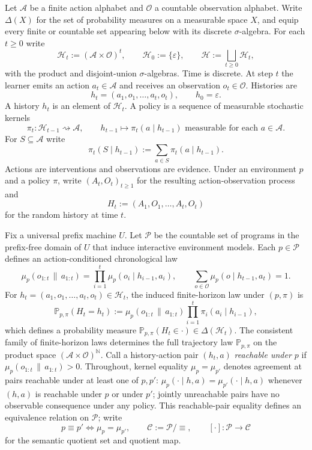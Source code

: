 \documentclass[11pt]{article}
\theoremstyle{definition}
\theoremstyle{remark}
\theoremstyle{plain}
\theoremstyle{definition}
\newcommand{\Acal}{\mathcal{A}}
\newcommand{\Ccal}{\mathcal{C}}
\newcommand{\Ocal}{\mathcal{O}}
\newcommand{\Pcal}{\mathcal{P}}
\newcommand{\Hcal}{\mathcal{H}}
\newcommand{\Prob}{\mathbb{P}}
\newcommand{\givena}{\,\|\,}
\begin{document}
Let $\Acal$ be a finite action alphabet and $\Ocal$ a countable observation alphabet. Write $\Delta(X)$ for the set of probability measures on a measurable space $X$, and equip every finite or countable set appearing below with its discrete $\sigma$-algebra. For each $t\ge 0$ write
\[
\Hcal_t:=(\Acal\times\Ocal)^t,
\qquad
\Hcal_0:=\{\varepsilon\},
\qquad
\Hcal:=\bigsqcup_{t\ge 0}\Hcal_t,
\]
with the product and disjoint-union $\sigma$-algebras. Time is discrete. At step $t$ the learner emits an action $a_t\in\Acal$ and receives an observation $o_t\in\Ocal$. Histories are
\[
h_t=(a_1,o_1,\dots,a_t,o_t),
\qquad
h_0=\varepsilon.
\]
A history $h_t$ is an element of $\Hcal_t$. A policy is a sequence of measurable stochastic kernels
\[
\pi_t:\Hcal_{t-1}\rightsquigarrow \Acal,
\qquad
h_{t-1}\longmapsto \pi_t(a\mid h_{t-1})\text{ measurable for each }a\in\Acal.
\]
For $S\subseteq\Acal$ write
\[
\pi_t(S\mid h_{t-1}):=\sum_{a\in S}\pi_t(a\mid h_{t-1}).
\]
Actions are interventions and observations are evidence. Under an environment $p$ and a policy $\pi$, write $(A_t,O_t)_{t\ge 1}$ for the resulting action-observation process and
\[
H_t:=(A_1,O_1,\dots,A_t,O_t)
\]
for the random history at time $t$.

Fix a universal prefix machine $U$. Let $\Pcal$ be the countable set of programs in the prefix-free domain of $U$ that induce interactive environment models. Each $p\in\Pcal$ defines an action-conditioned chronological law
\[
\mu_p(o_{1:t}\givena a_{1:t})
=
\prod_{i=1}^{t}\mu_p(o_i\mid h_{i-1},a_i),
\qquad
\sum_{o\in\Ocal}\mu_p(o\mid h_{t-1},a_t)=1.
\]
For $h_t=(a_1,o_1,\dots,a_t,o_t)\in\Hcal_t$, the induced finite-horizon law under $(p,\pi)$ is
\[
\Prob_{p,\pi}(H_t=h_t)
:=
\mu_p(o_{1:t}\givena a_{1:t})\prod_{i=1}^t \pi_i(a_i\mid h_{i-1}),
\]
which defines a probability measure $\Prob_{p,\pi}(H_t\in\cdot)\in\Delta(\Hcal_t)$. The consistent family of finite-horizon laws determines the full trajectory law $\Prob_{p,\pi}$ on the product space $(\Acal\times\Ocal)^{\mathbb N}$. Call a history-action pair $(h_t,a)$ \emph{reachable under $p$} if $\mu_p(o_{1:t}\givena a_{1:t})>0$. Throughout, kernel equality $\mu_p=\mu_{p'}$ denotes agreement at pairs reachable under at least one of $p,p'$: $\mu_p(\cdot\mid h,a)=\mu_{p'}(\cdot\mid h,a)$ whenever $(h,a)$ is reachable under $p$ or under $p'$; jointly unreachable pairs have no observable consequence under any policy. This reachable-pair equality defines an equivalence relation on $\Pcal$; write
\[
p\equiv p'
\iff
\mu_p=\mu_{p'},
\qquad
\Ccal:=\Pcal/\!\equiv,
\qquad
[\cdot]:\Pcal\to\Ccal
\]
for the semantic quotient set and quotient map.
\end{document}
